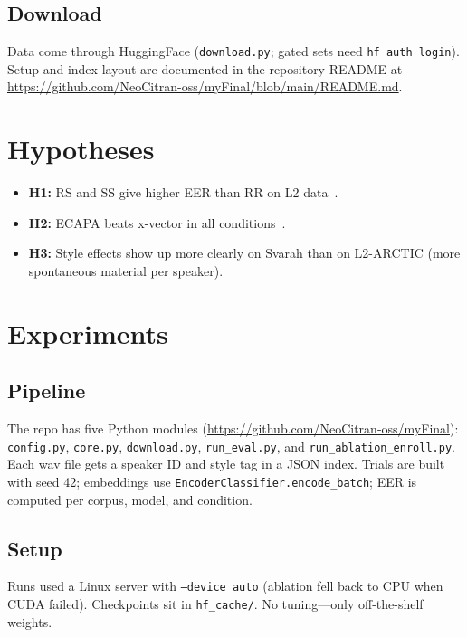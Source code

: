 \documentclass[cameraready]{Interspeech}
\begin{document}
\subsection{Download}

Data come through HuggingFace (\texttt{download.py}; gated sets need \texttt{hf auth login}). Setup and index layout are documented in the repository README at \url{https://github.com/NeoCitran-oss/myFinal/blob/main/README.md}.

\section{Hypotheses}
\label{sec:hypotheses}

\begin{itemize}
  \item \textbf{H1:} RS and SS give higher EER than RR on L2 data~\cite{martinek2025read,park2018style,javali2024style}.
  \item \textbf{H2:} ECAPA beats x-vector in all conditions~\cite{desplanques2020ecapa}.
  \item \textbf{H3:} Style effects show up more clearly on Svarah than on L2-ARCTIC (more spontaneous material per speaker).
\end{itemize}

\section{Experiments}
\label{sec:experiments}

\subsection{Pipeline}

The repo has five Python modules (\url{https://github.com/NeoCitran-oss/myFinal}): \texttt{config.py}, \texttt{core.py}, \texttt{download.py}, \texttt{run\_eval.py}, and \texttt{run\_ablation\_enroll.py}. Each wav file gets a speaker ID and style tag in a JSON index. Trials are built with seed 42; embeddings use \texttt{EncoderClassifier.encode\_batch}; EER is computed per corpus, model, and condition.

\subsection{Setup}

Runs used a Linux server with \texttt{--device auto} (ablation fell back to CPU when CUDA failed). Checkpoints sit in \texttt{hf\_cache/}. No tuning---only off-the-shelf weights.
\end{document}
